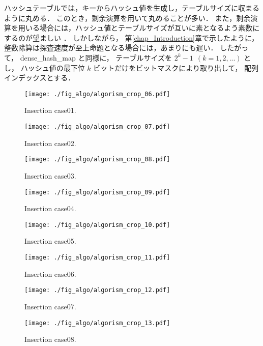 ハッシュテーブルでは，キーからハッシュ値を生成し，テーブルサイズに収まるように丸める．
このとき，剰余演算を用いて丸めることが多い．
また，剰余演算を用いる場合には，ハッシュ値とテーブルサイズが互いに素となるよう素数にするのが望ましい \citep{石畑1989}．
しかしながら，
第\ref{chap_Introduction}章で示したように，
整数除算は探査速度が至上命題となる場合には，あまりにも遅い．
したがって，
dense\_hash\_map と同様に，
テーブルサイズを $2^k-1\ \ (k=1,2,...)$ とし，
ハッシュ値の最下位 $k$ ビットだけをビットマスクにより取り出して，
配列インデックスとする．


\begin{figure}[h]
  \texttt{[image: ./fig\_algo/algorism\_crop\_06.pdf]}
  \caption{ Insertion case01. }
  \label{fig_IpCHashT_insert_hard_case01}

  \texttt{[image: ./fig\_algo/algorism\_crop\_07.pdf]}
  \caption{ Insertion case02. }
  \label{fig_IpCHashT_insert_hard_case02}

  \texttt{[image: ./fig\_algo/algorism\_crop\_08.pdf]}
  \caption{ Insertion case03. }
  \label{fig_IpCHashT_insert_hard_case03}

  \texttt{[image: ./fig\_algo/algorism\_crop\_09.pdf]}
  \caption{ Insertion case04. }
  \label{fig_IpCHashT_insert_hard_case04}
\end{figure}

\begin{figure}[h]
  \texttt{[image: ./fig\_algo/algorism\_crop\_10.pdf]}
  \caption{ Insertion case05. }
  \label{fig_IpCHashT_insert_hard_case05}

  \texttt{[image: ./fig\_algo/algorism\_crop\_11.pdf]}
  \caption{ Insertion case06. }
  \label{fig_IpCHashT_insert_hard_case06}

  \texttt{[image: ./fig\_algo/algorism\_crop\_12.pdf]}
  \caption{ Insertion case07. }
  \label{fig_IpCHashT_insert_hard_case07}

  \texttt{[image: ./fig\_algo/algorism\_crop\_13.pdf]}
  \caption{ Insertion case08. }
  \label{fig_IpCHashT_insert_hard_case08}
\end{figure}

